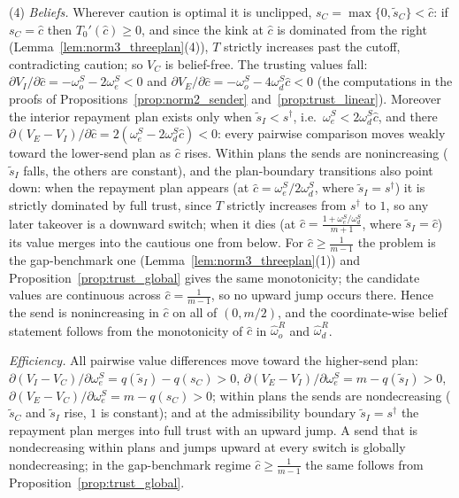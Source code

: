 \documentclass[11pt]{article}
\theoremstyle{plain}
\theoremstyle{remark}
\begin{document}
(4) \emph{Beliefs.}  Wherever caution is optimal it is unclipped, $s_C=\max\{0,\tilde s_C\}<\hat c$: if $s_C=\hat c$ then $T_0'(\hat c)\ge0$, and since the kink at $\hat c$ is dominated from the right (Lemma~\ref{lem:norm3_threeplan}(4)), $T$ strictly increases past the cutoff, contradicting caution; so $V_C$ is belief-free.  The trusting values fall: $\partial V_I/\partial\hat c=-\omega_o^S-2\omega_e^S<0$ and $\partial V_E/\partial\hat c=-\omega_o^S-4\omega_d^S\hat c<0$ (the computations in the proofs of Propositions~\ref{prop:norm2_sender} and~\ref{prop:trust_linear}).  Moreover the interior repayment plan exists only when $\tilde s_I<s^\dagger$, i.e.\ $\omega_e^S<2\omega_d^S\hat c$, and there $\partial(V_E-V_I)/\partial\hat c=2(\omega_e^S-2\omega_d^S\hat c)<0$: every pairwise comparison moves weakly toward the lower-send plan as $\hat c$ rises.  Within plans the sends are nonincreasing ($\tilde s_I$ falls, the others are constant), and the plan-boundary transitions also point down: when the repayment plan appears (at $\hat c=\omega_e^S/2\omega_d^S$, where $\tilde s_I=s^\dagger$) it is strictly dominated by full trust, since $T$ strictly increases from $s^\dagger$ to $1$, so any later takeover is a downward switch; when it dies (at $\hat c=\frac{1+\omega_e^S/\omega_d^S}{m+1}$, where $\tilde s_I=\hat c$) its value merges into the cautious one from below.  For $\hat c\ge\frac1{m-1}$ the problem is the gap-benchmark one (Lemma~\ref{lem:norm3_threeplan}(1)) and Proposition~\ref{prop:trust_global} gives the same monotonicity; the candidate values are continuous across $\hat c=\frac1{m-1}$, so no upward jump occurs there.  Hence the send is nonincreasing in $\hat c$ on all of $(0,m/2)$, and the coordinate-wise belief statement follows from the monotonicity of $\hat c$ in $\hat\omega_o^{R}$ and $\hat\omega_d^{R}$.

\emph{Efficiency.}  All pairwise value differences move toward the higher-send plan: $\partial(V_I-V_C)/\partial\omega_e^S=q(\tilde s_I)-q(s_C)>0$, $\partial(V_E-V_I)/\partial\omega_e^S=m-q(\tilde s_I)>0$, $\partial(V_E-V_C)/\partial\omega_e^S=m-q(s_C)>0$; within plans the sends are nondecreasing ($\tilde s_C$ and $\tilde s_I$ rise, $1$ is constant); and at the admissibility boundary $\tilde s_I=s^\dagger$ the repayment plan merges into full trust with an upward jump.  A send that is nondecreasing within plans and jumps upward at every switch is globally nondecreasing; in the gap-benchmark regime $\hat c\ge\frac1{m-1}$ the same follows from Proposition~\ref{prop:trust_global}.
\end{document}

